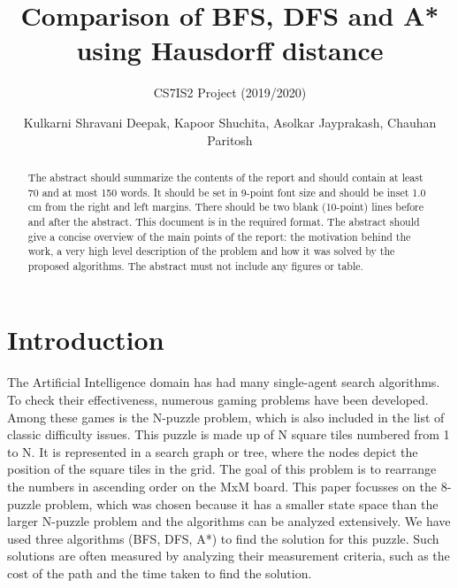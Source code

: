 \documentclass{svproc}
\begin{document}
\mainmatter
\title{Comparison of BFS, DFS and A* using Hausdorff distance}
\subtitle{CS7IS2 Project (2019/2020)}
\author{Kulkarni Shravani Deepak, Kapoor Shuchita, Asolkar Jayprakash, Chauhan Paritosh}



\maketitle

\begin{abstract}
The abstract should summarize the contents of the report and should contain at least 70 and at most 150 words. It should be set in 9-point font size and should be inset 1.0 cm from the right and left margins. There should be two blank (10-point) lines before and after the abstract. This document is in the required format. The abstract should give a concise overview of the main points of the report: the motivation behind the work, a very high level description of the problem and how it was solved by the proposed algorithms. The abstract must not include any figures or table.
\end{abstract}
%

 

\section{Introduction}
The Artificial Intelligence domain has had many single-agent search algorithms. To check their effectiveness, numerous gaming problems have been developed. Among these games is the N-puzzle problem, which is also included in the list of classic difficulty issues. This puzzle is made up of N square tiles numbered from 1 to N. It is represented in a search graph or tree, where the nodes depict the position of the square tiles in the grid. The goal of this problem is to rearrange the numbers in ascending order on the MxM board. This paper focusses on the 8-puzzle problem, which was chosen because it has a smaller state space than the larger N-puzzle problem and the algorithms can be analyzed extensively. We have used three algorithms (BFS, DFS, A*) to find the solution for this puzzle. Such solutions are often measured by analyzing their measurement criteria, such as the cost of the path and the time taken to find the solution. \\
\end{document}
